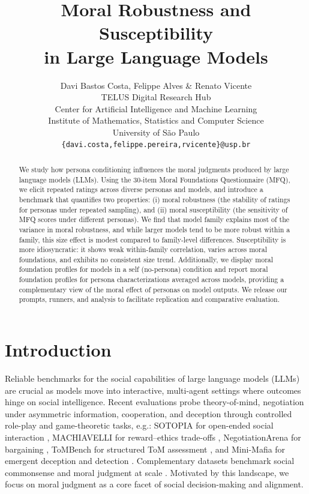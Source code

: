\documentclass{article}
\title{Moral Robustness and Susceptibility\\ in Large Language Models}
\author{Davi Bastos Costa, Felippe Alves \& Renato Vicente \\
TELUS Digital Research Hub\\ 
Center for Artificial Intelligence and Machine Learning\\
Institute of Mathematics, Statistics and Computer Science\\
University of São Paulo \\
\texttt{\{davi.costa,felippe.pereira,rvicente\}@usp.br} \\
}
\begin{document}
\maketitle

\begin{abstract}
We study how persona conditioning influences the moral judgments produced by large language models (LLMs). Using the 30-item Moral Foundations Questionnaire (MFQ), we elicit repeated ratings across diverse personas and models, and introduce a benchmark that quantifies two properties: (i) moral robustness (the stability of ratings for personas under repeated sampling), and (ii) moral susceptibility (the sensitivity of MFQ scores under different personas). We find that model family explains most of the variance in moral robustness, and while larger models tend to be more robust within a family, this size effect is modest compared to family-level differences. Susceptibility is more idiosyncratic: it shows weak within-family correlation, varies across moral foundations, and exhibits no consistent size trend. Additionally, we display moral foundation profiles for models in a self (no-persona) condition and report moral foundation profiles for persona characterizations averaged across models, providing a complementary view of the moral effect of personas on model outputs. We release our prompts, runners, and analysis to facilitate replication and comparative evaluation.
\end{abstract}

\section{Introduction}
Reliable benchmarks for the social capabilities of large language models (LLMs) are crucial as models move into interactive, multi-agent settings where outcomes hinge on social intelligence. Recent evaluations probe theory-of-mind, negotiation under asymmetric information, cooperation, and deception through controlled role-play and game-theoretic tasks, e.g.: SOTOPIA for open-ended social interaction \cite{zhou2024sotopia}, MACHIAVELLI for reward–ethics trade-offs \cite{pan2023machiavelli}, NegotiationArena for bargaining \cite{bianchi2024negotiationarena}, ToMBench for structured ToM assessment \cite{chen-etal-2024-tombench}, and Mini-Mafia for emergent deception and detection \cite{costa2025deceivedetectdiscloselarge}. Complementary datasets benchmark social commonsense and moral judgment at scale \cite{sap-etal-2019-social,hendrycks2021ethics}. Motivated by this landscape, we focus on moral judgment as a core facet of social decision-making and alignment.
\end{document}
